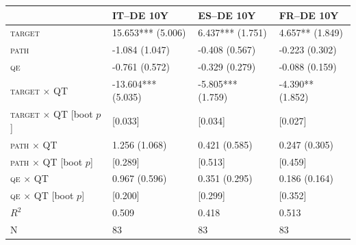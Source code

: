 \begin{tabular}{llll}
\toprule
 & IT--DE 10Y & ES--DE 10Y & FR--DE 10Y \\
\midrule
\textsc{target} & 15.653*** (5.006) & 6.437*** (1.751) & 4.657** (1.849) \\
\textsc{path} & -1.084 (1.047) & -0.408 (0.567) & -0.223 (0.302) \\
\textsc{qe} & -0.761 (0.572) & -0.329 (0.279) & -0.088 (0.159) \\
\textsc{target} $\times$ QT & -13.604*** (5.035) & -5.805*** (1.759) & -4.390** (1.852) \\
\textsc{target} $\times$ QT [boot $p$] & [0.033] & [0.034] & [0.027] \\
\textsc{path} $\times$ QT & 1.256 (1.068) & 0.421 (0.585) & 0.247 (0.305) \\
\textsc{path} $\times$ QT [boot $p$] & [0.289] & [0.513] & [0.459] \\
\textsc{qe} $\times$ QT & 0.967 (0.596) & 0.351 (0.295) & 0.186 (0.164) \\
\textsc{qe} $\times$ QT [boot $p$] & [0.200] & [0.299] & [0.352] \\
$R^2$ & 0.509 & 0.418 & 0.513 \\
N & 83 & 83 & 83 \\
\bottomrule
\end{tabular}
